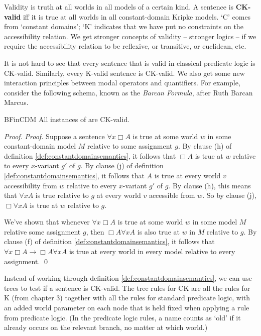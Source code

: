 Validity is truth at all worlds in all models of a certain kind. A sentence is
\textbf{CK-valid} iff it is true at all worlds in all constant-domain Kripke
models. `C' comes from `constant domains'; `K' indicates that we have put no
constraints on the accessibility relation. We get stronger concepts of validity
-- stronger logics -- if we require the accessibility relation to be reflexive,
or transitive, or euclidean, etc.

It is not hard to see that every sentence that is valid in classical predicate
logic is CK-valid. Similarly, every K-valid sentence is CK-valid. We also get
some new interaction principles between modal operators and quantifiers. For
example, consider the following schema, known as the \emph{Barcan Formula},
after Ruth Barcan Marcus.
%

\begin{observation}{BFinCDM}
  All instances of  are CK-valid.
\end{observation}
\begin{proof}
  \emph{Proof.} Suppose a sentence $\forall x \Box A$ is true at some world $w$
  in some constant-domain model $M$ relative to some assignment $g$. By clause
  (h) of definition \ref{def:constantdomainsemantics}, it follows that $\Box A$
  is true at $w$ relative to every $x$-variant $g'$ of $g$. By clause (j) of
  definition \ref{def:constantdomainsemantics}, it follows that $A$ is true at
  every world $v$ accessibility from $w$ relative to every $x$-variant $g'$ of
  $g$. By clause (h), this means that $\forall x A$ is true relative to $g$ at
  every world $v$ accessible from $w$. So by clause (j), $\Box \forall x A$ is
  true at $w$ relative to $g$.

  We've shown that whenever $\forall x \Box A$ is true at some world $w$ in some
  model $M$ relative some assignment $g$, then $\Box A \forall x A$ is also true
  at $w$ in $M$ relative to $g$. By clause (f) of definition
  \ref{def:constantdomainsemantics}, it follows that
  $\forall x \Box A \to\Box A \forall x A$ is true at every world in every model
  relative to every assignment. \qed
\end{proof}

Instead of working through definition \ref{def:constantdomainsemantics}, we can
use trees to test if a sentence is CK-valid. The tree rules for CK are all the
rules for K (from chapter 3) together with all the rules for standard predicate
logic, with an added world parameter on each node that is held fixed when
applying a rule from predicate logic. (In the predicate logic rules, a
name counts as `old' if it already occurs on the relevant branch, no matter at which world.)

